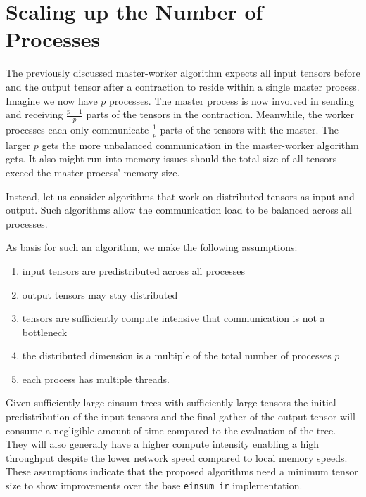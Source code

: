 \section{Scaling up the Number of Processes}
\label{sec:n_nodes}

The previously discussed master-worker algorithm expects all input tensors before and the output tensor after a contraction to reside within a single master process.
Imagine we now have $p$ processes.
The master process is now involved in sending and receiving $\frac{p-1}{p}$ parts of the tensors in the contraction.
Meanwhile, the worker processes each only communicate $\frac{1}{p}$ parts of the tensors with the master.
The larger $p$ gets the more unbalanced communication in the master-worker algorithm gets.
It also might run into memory issues should the total size of all tensors exceed the master process' memory size.

Instead, let us consider algorithms that work on distributed tensors as input and output.
Such algorithms allow the communication load to be balanced across all processes.

As basis for such an algorithm, we make the following assumptions:
\begin{enumerate}
    \item input tensors are predistributed across all processes
    \item output tensors may stay distributed
    \item tensors are sufficiently compute intensive that communication is not a bottleneck
    \item the distributed dimension is a multiple of the total number of processes $p$
    \item each process has multiple threads.
\end{enumerate}


Given sufficiently large einsum trees with sufficiently large tensors the initial predistribution of the input tensors and the final gather of the output tensor will consume a negligible amount of time compared to the evaluation of the tree.
They will also generally have a higher compute intensity enabling a high throughput despite the lower network speed compared to local memory speeds.
These assumptions indicate that the proposed algorithms need a minimum tensor size to show improvements over the base \texttt{einsum\_ir} implementation.

